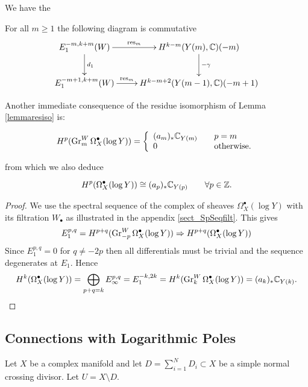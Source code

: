 \documentclass[../main.tex]{subfiles}
\begin{document}
We have the
\begin{proposition} \textup{\cite[Prop. 4.7]{PS08}}
    For all $m \geq 1$ the following diagram is commutative
     \begin{equation}\label{E1}
\xymatrix{
   E^{-m,k+m}_1(W) \ar[d]^-{d_1} \ar[r]^-{\res_m} & H^{k-m}(Y(m), \C)(-m) \ar[d]^-{-\gamma}    \\ 
   E^{-m+1,k+m}_1(W) \ar[r]^-{\res_m} & H^{k-m+2}(Y(m-1), \C)(-m+1)
}
\end{equation}
\end{proposition} 

Another immediate consequence of the residue isomorphism of Lemma \ref{lemmaresiso} is:

\begin{cor}
\begin{eqnarray*}    H^p(\operatorname{Gr}^W_m \Omega^\bullet_X(\log Y) )  =\left\{\begin{array}{ll} (a_m)_* \mathbb{C}_{Y(m)} &\quad p=m\\ 0&\quad\hbox{otherwise.}\end{array}\right.\\
\end{eqnarray*}
\end{cor}

from which we also deduce

\begin{cor}
 \[
 H^p(\Omega^\bullet_X(\log Y)) \cong (a_p)_* \mathbb{C}_{Y(p)} \qquad \forall p \in \mathbb{Z}. 
 \] 
 \end{cor}
  \begin{proof}
      We use the spectral sequence of the complex of sheaves $\Omega^\bullet_X( \log Y)$ with its filtration $W_\bullet$ as illustrated in the appendix \ref{sect_SpSeqfilt}. 
      This gives 
      \[
      E_1^{p,q} = H^{p+q}(\operatorname{Gr}^W_{-p} \Omega^\bullet_X(\log Y)) \Rightarrow H^{p+q}( \Omega^\bullet_X(\log Y))
      \]
Since $E_1^{p,q} = 0$ for $q \neq -2p$ then all differentials must be trivial and the sequence degenerates at $E_1$. Hence 
\[
  H^{k}( \Omega^\bullet_X(\log Y)) = \bigoplus_{p+q=k} E^{p,q}_\infty = E_1^{-k,2k} = H^{k}(\operatorname{Gr}^W_{k} \Omega^\bullet_X(\log Y)) =  (a_k)_* \mathbb{C}_{Y(k)} .
  \]
  \end{proof}


\subsection{Connections with Logarithmic Poles}

Let $X$ be a complex manifold and let $D = \sum_{i=1}^N D_i \subset X$ be a simple normal crossing divisor. Let $U = X \setminus D$.
\end{document}
